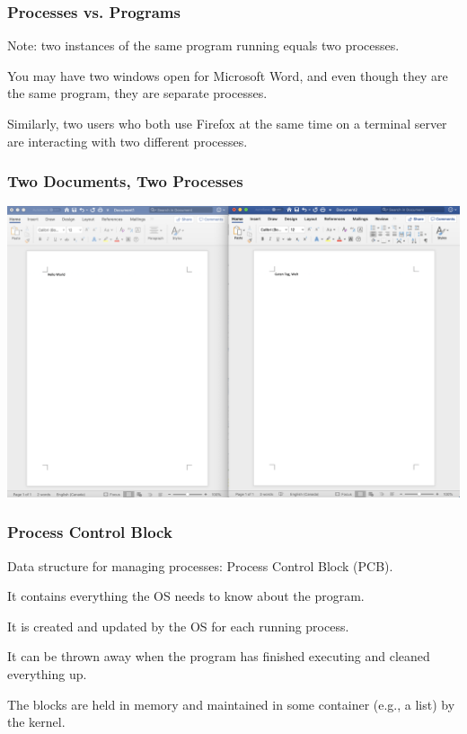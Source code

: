 \begin{frame}
	\frametitle{Processes vs. Programs}

	Note: two instances of the same program running equals two processes.

	You may have two windows open for Microsoft Word, and even though they are the same program, they are separate processes.


	Similarly, two users who both use Firefox at the same time on a terminal server are interacting with two different processes.

\end{frame}


\begin{frame}
	\frametitle{Two Documents, Two Processes}

	\begin{center}
		\includegraphics[width=\textwidth]{images/2docs.png}
	\end{center}


\end{frame}


\begin{frame}
	\frametitle{Process Control Block}

	Data structure for managing processes: \alert{Process Control Block} (PCB).

	It contains everything the OS needs to know about the program.

	It is created and updated by the OS for each running process.

	It can be thrown away when the program has finished executing and cleaned everything up.

	The blocks are held in memory and maintained in some container (e.g., a list) by the kernel.


\end{frame}

